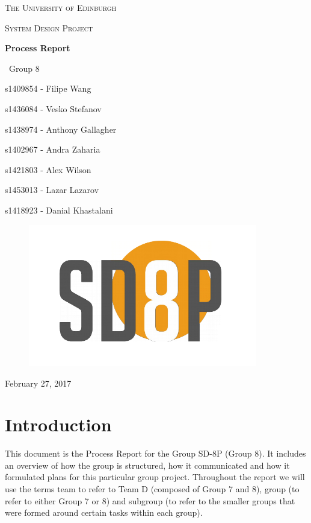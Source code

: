 \documentclass[a4paper,12pt]{article}
\begin{document}
\begin{titlepage}
	\centering
	{\scshape\LARGE The University of Edinburgh \par}
	\vspace{1cm}
	{\scshape\Large System Design Project\par}
	\vspace{1.5cm}
	{\huge\bfseries Process Report\par}
	\vspace{2cm}
	{\Large\ Group 8\par}
	\vfill
	{\normalsize s1409854  - Filipe Wang\par}
	{\normalsize s1436084  - Vesko Stefanov\par}
	{\normalsize s1438974  - Anthony Gallagher\par}
	{\normalsize s1402967  - Andra Zaharia\par}
	{\normalsize s1421803  - Alex Wilson\par}
	{\normalsize s1453013  - Lazar Lazarov\par}
	{\normalsize s1418923  - Danial Khastalani\par}
	\vfill
\begin{figure}[H]
    \centering
    \includegraphics[width=10cm]{sd8plogo}
    \label{fig:robot}
\end{figure}
	\vfill

	{\large February 27, 2017\par}
\end{titlepage}

\section{Introduction}
This document is the Process Report for the Group SD-8P (Group 8). It includes an overview of how the group is structured, how it communicated and how it formulated plans for this particular group project. Throughout the report we will use the terms team to refer to Team D (composed of Group 7 and 8), group (to refer to either Group 7 or 8) and subgroup (to refer to the smaller groups that were formed around certain tasks within each group).
\end{document}
